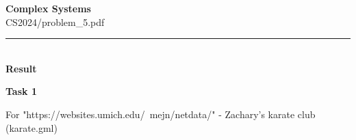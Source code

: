 \documentclass[10pt,letterpaper, onecolumn]{report}
\begin{document}
\begingroup
    \centering
    \LARGE \textbf{Complex Systems} \\
    \large CS2024/problem\_5.pdf \\[0.5em]
\endgroup

\begin{flushleft}
    \rule{\textwidth}{0.4pt} \\ %
    \textbf{Result}
\end{flushleft}

\begin{flushleft}
    \textbf{Task 1}
    \hfill\break
    \setlength{\parindent}{1.5em} %
    \setlength{\parskip}{0.5em}   %

    For "https://websites.umich.edu/~mejn/netdata/" - Zachary's karate club (karate.gml)


\end{flushleft}
\end{document}
